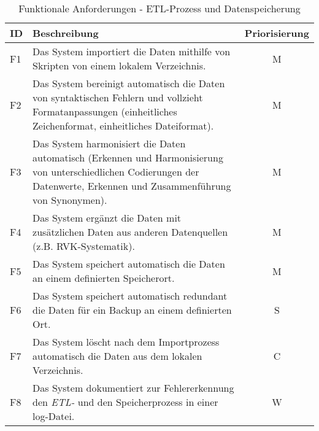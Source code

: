 \begingroup
\setlength{\tabcolsep}{10pt} %
\renewcommand{\arraystretch}{1.25}
\begin{table}[h]
    \centering
    \begin{adjustbox}{max width=\textwidth}
    \begin{tabular}{lp{15cm}c}
       \toprule
       \textbf{ID}          & \textbf{Beschreibung} &\textbf{Priorisierung}\\
       \midrule
        F1                             &Das System importiert die Daten mithilfe von Skripten von einem lokalem Verzeichnis. & M\\
        F2                              &Das System bereinigt automatisch die Daten von syntaktischen Fehlern und vollzieht Formatanpassungen (einheitliches Zeichenformat, einheitliches Dateiformat). & M \\
        F3                              &Das System harmonisiert die Daten automatisch (Erkennen und Harmonisierung von unterschiedlichen Codierungen der Datenwerte, Erkennen und Zusammenführung von Synonymen). & M \\
        F4                              &Das System ergänzt die Daten mit zusätzlichen Daten aus anderen Datenquellen (z.B. RVK-Systematik). & M \\
        F5                             &Das System speichert automatisch die Daten an einem definierten Speicherort.  & M\\
        F6                              &Das System speichert automatisch redundant die Daten für ein Backup an einem definierten Ort.  & S\\
        F7                              &Das System löscht nach dem Importprozess automatisch die Daten aus dem lokalen Verzeichnis.  & C\\
        F8                              &Das System dokumentiert zur Fehlererkennung den \textit{\acrshort{ETL}-} und den Speicherprozess in einer log-Datei. & W\\
    \bottomrule
    \end{tabular}
    \end{adjustbox}
    \caption{%
        Funktionale Anforderungen - ETL-Prozess und Datenspeicherung
    }
    \label{tab:funktionale Anforderungen I}
    \end{table}
\endgroup

